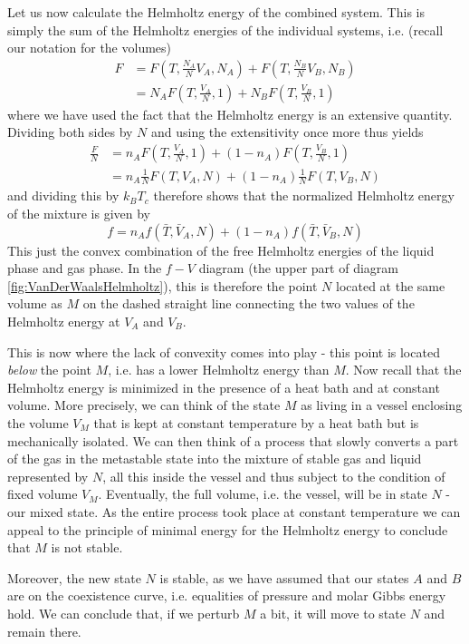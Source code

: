 \documentclass[a4paper, draft]{article}
\theoremstyle{own}
\theoremstyle{remark}
\begin{document}
Let us now calculate the Helmholtz energy of the combined system. This is simply the sum of the Helmholtz energies of the individual systems, i.e. (recall our notation for the volumes)
\begin{align*}
F &= F(T, \frac{N_A}{N} V_A, N_A) + F(T, \frac{N_B}{N} V_B, N_B) \\
&= N_A F(T, \frac{V_A}{N}, 1) + N_B F(T, \frac{V_B}{N}, 1)
\end{align*}
where we have used the fact that the Helmholtz energy is an extensive quantity. Dividing both sides by $N$ and using the extensitivity once more thus yields
\begin{align*}
\frac{F}{N} &= n_A F(T, \frac{V_A}{N}, 1) + (1 - n_A) F(T, \frac{V_B}{N}, 1) \\
&= n_A \frac{1}{N} F(T, V_A, N) + (1 - n_A) \frac{1}{N} F(T, V_B, N) 
\end{align*}
and dividing this by $k_B T_c$ therefore shows that the normalized Helmholtz energy of the mixture is given by
$$
f = n_A f(\bar{T}, \bar{V}_A, N) + (1 - n_A) f(\bar{T}, \bar{V}_B, N)
$$
This just the convex combination of the free Helmholtz energies of the liquid phase and gas phase. In the $f - V$ diagram (the upper part of diagram \ref{fig:VanDerWaalsHelmholtz}), this is therefore the point $N$ located at the same volume as $M$ on the dashed straight line connecting the two values of the Helmholtz energy at $V_A$ and $V_B$.

This is now where the lack of convexity comes into play - this point is located {\em below} the point $M$, i.e. has a lower Helmholtz energy than $M$. Now recall that the Helmholtz energy is minimized in the presence of a heat bath and at constant volume. More precisely, we can think of the state $M$ as living in a vessel enclosing the volume $V_M$ that is kept at constant temperature by a heat bath but is mechanically isolated. We can then think of a process that slowly converts a part of the gas in the metastable state into the mixture of stable gas and liquid represented by $N$, all this inside the vessel and thus subject to the condition of fixed volume $V_M$. Eventually, the full volume, i.e. the vessel, will be in state $N$ - our mixed state. As the entire process took place at constant temperature we can appeal to the principle of minimal energy for the Helmholtz energy to conclude that $M$ is not stable. 

Moreover, the new state $N$ is stable, as we have assumed that our states $A$ and $B$ are on the coexistence curve, i.e. equalities of pressure and molar Gibbs energy hold. We can conclude that, if we perturb $M$ a bit, it will move to state $N$ and remain there.  
\end{document}
